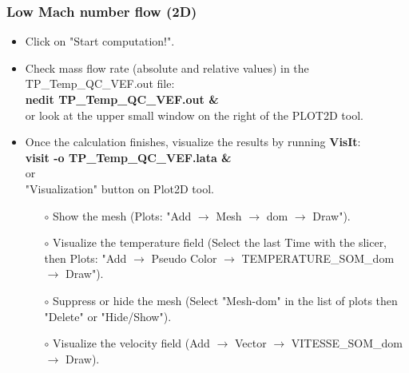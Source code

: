 \documentclass[10pt, hyperref={unicode=true,pdfusetitle, bookmarks=true,bookmarksnumbered=false,bookmarksopen=false, breaklinks=false,pdfborder={0 0 1},backref=true,colorlinks=true,linkcolor=darkblue,pageanchor}]{beamer}
\begin{document}
\begin{frame}
\frametitle{Low Mach number flow (2D)}
\begin{block}{}

\begin{itemize}
\item Click on "Start computation!".
\item Check mass flow rate (absolute and relative values) in the TP\_Temp\_QC\_VEF.out file: \\
\textbf{nedit TP\_Temp\_QC\_VEF.out \&} \\
or look at the upper small window on the right of the PLOT2D tool.

\item Once the calculation finishes, visualize the results by running \textbf{VisIt}:\\
\textbf{visit -o TP\_Temp\_QC\_VEF.lata \&}\\
or \\
"Visualization" button on Plot2D tool.
\begin{itemize}
    \item [$\circ$] Show the mesh (Plots: "Add $\rightarrow$ Mesh $\rightarrow$ dom $\rightarrow$ Draw").
    \item [$\circ$] Visualize the temperature field (Select the last Time with the slicer, then Plots: "Add $\rightarrow$ Pseudo Color $\rightarrow$ TEMPERATURE\_SOM\_dom  $\rightarrow$ Draw").
    \item [$\circ$] Suppress or hide the mesh (Select "Mesh-dom" in the list of plots then "Delete" or "Hide/Show").
    \item [$\circ$] Visualize the velocity field (Add $\rightarrow$ Vector $\rightarrow$ VITESSE\_SOM\_dom $\rightarrow$ Draw).
\end{itemize}

\end{itemize}

\end{block}
\end{frame}
\end{document}
